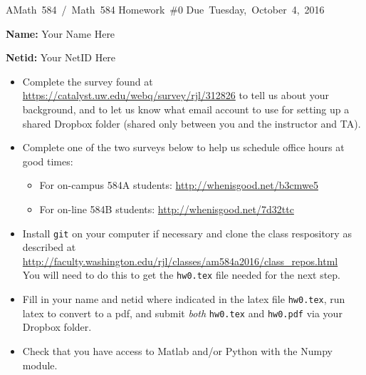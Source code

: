 \documentclass[10pt]{article}
\begin{document}
\hfill \vbox{
\hbox{AMath 584 / Math 584}
\hbox{Homework \#0}
\hbox{Due Tuesday, October 4, 2016}
}


\vskip 0.5cm

{\bf Name:}   Your Name Here

{\bf Netid:}  Your NetID Here

\vskip 1cm

\begin{itemize} 
\item Complete the survey found at
\url{https://catalyst.uw.edu/webq/survey/rjl/312826} 
to tell us about your background, and to let us know what email
account to use for setting up a shared Dropbox folder (shared only
between you and the instructor and TA).

\item Complete one of the two surveys below to help us schedule office hours
at good times:

    \begin{itemize} 
    \item For on-campus 584A students: \url{http://whenisgood.net/b3cmwe5}
    \item For on-line 584B students: \url{http://whenisgood.net/7d32ttc}
    \end{itemize} 

\item Install {\tt git} on your computer if necessary and clone the class
respository as described at \\
\url{http://faculty.washington.edu/rjl/classes/am584a2016/class_repos.html}\\  
You will need to do this to get the {\tt hw0.tex} file needed for the next step.

\item Fill in your name and netid where
indicated in the latex file {\tt hw0.tex}, run latex to 
convert to a pdf, and submit {\em both} {\tt hw0.tex} and {\tt hw0.pdf}
via your Dropbox folder.

\item Check that you have access to Matlab and/or Python with the Numpy
module.

\end{itemize} 
\end{document}
